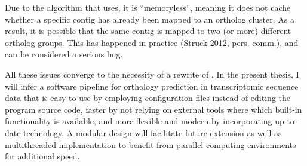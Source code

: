 Due to the algorithm that \hamstr uses, it is ``memoryless'', meaning it does
not cache whether a specific contig has already been mapped to an ortholog
cluster. As a result, it is possible that the same contig is mapped to two (or
more) different ortholog groups. This has happened in practice (Struck 2012,
pers. comm.), and can be considered a serious bug.

All these issues converge to the necessity of a rewrite of \hamstr. In the
present thesis, I will infer a software pipeline for orthology prediction in
transcriptomic sequence data that is easy to use by employing configuration
files instead of editing the program source code, faster by not relying on
external tools where which built-in functionality is available, and more
flexible and modern by incorporating up-to-date technology. A modular design
will facilitate future extension as well as multithreaded implementation to
benefit from parallel computing environments for additional speed.
